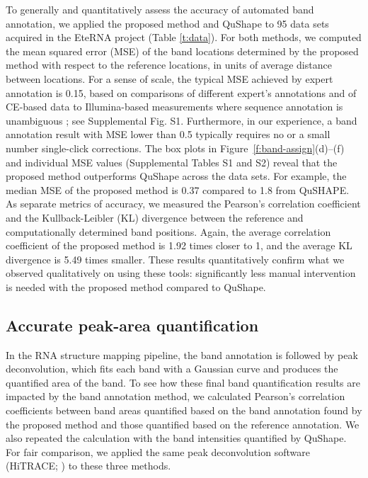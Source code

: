 To generally and quantitatively assess the accuracy of automated band annotation, we applied the proposed method and QuShape to 95 data sets acquired in the EteRNA project (Table \ref{t:data}). For both methods, we computed the mean squared error (MSE) of the band locations determined by the proposed method with respect to the reference locations, in units of average distance between locations. For a sense of scale, the typical MSE achieved by expert annotation is 0.15, based on comparisons of different expert's annotations and of CE-based data to Illumina-based measurements where sequence annotation is unambiguous \citep{Kladwang2014}; see Supplemental Fig. S1. Furthermore, in our experience, a band annotation result with MSE lower than 0.5 typically requires no or a small number single-click corrections. The box plots in Figure~\ref{f:band-assign}(d)--(f) and individual MSE values (Supplemental Tables S1 and S2) reveal that the proposed method outperforms QuShape across the data sets. For example, the median MSE of the proposed method is 0.37 compared to 1.8 from QuSHAPE. As separate metrics of accuracy, we measured the Pearson's correlation coefficient and the Kullback-Leibler (KL) divergence between the reference and computationally determined band positions.  Again, the average correlation coefficient of the proposed method is 1.92 times closer to 1, and the average KL divergence is 5.49 times smaller. These results quantitatively confirm what we observed qualitatively on using these tools: significantly less manual intervention is needed with the proposed method compared to QuShape.


\subsection{Accurate peak-area quantification}\label{ss:peak-area}
In the RNA structure mapping pipeline, the band annotation is followed by peak deconvolution, which fits each band with a Gaussian curve and produces the quantified area of the band. To see how these final band quantification results are impacted by the band annotation method, we calculated Pearson's correlation coefficients between band areas quantified based on the band annotation found by the proposed method and those quantified based on the reference annotation. We also repeated the calculation with the band intensities quantified by QuShape. For fair comparison, we applied the same peak deconvolution software (HiTRACE; \citealp{Yoon2011}) to these three methods.

